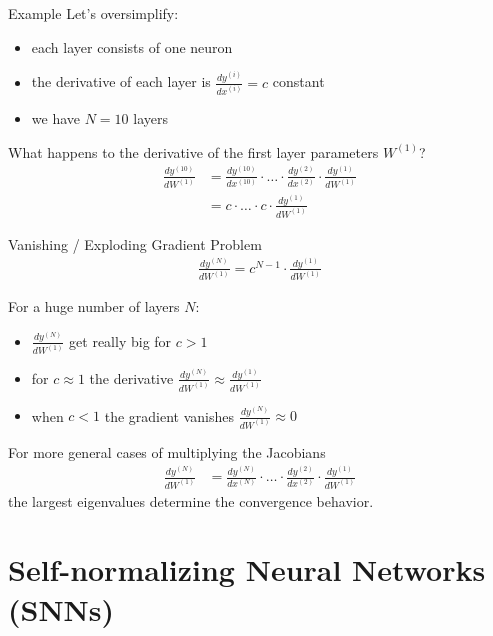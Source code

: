 \documentclass[aspectratio=169]{beamer}
\begin{document}
\begin{frame}{Example}
Let's oversimplify:
\begin{itemize}
\item each layer consists of one neuron
\item the derivative of each layer is $\frac{d y^{(i)} } {d x^{(i)}} = c $ constant
\item we have $N=10$ layers
\end{itemize}
What happens to the derivative of the first layer parameters $ W^{(1)} $?
\begin{align*}
\frac{d y^{(10)}} { d W^{(1)}} &= \frac{ d y^{(10)}} {d x^{(10 )}} \cdot \ldots \cdot \frac{ d y^{(2)}} {d x^{(2)}} \cdot \frac{d y^{(1)}} {d W^{(1)}} \\
 & = c \cdot \ldots \cdot c \cdot \frac{d y^{(1)}} {d W^{(1)}}
\end{align*}
\end{frame}



\begin{frame}{Vanishing / Exploding Gradient Problem}
\begin{align*}
\frac{d y^{(N)}} { d W^{(1)}} = c^{N -1} \cdot \frac{d y^{(1)}} {d W^{(1)}}
\end{align*}

For a huge number of layers $N$:
\begin{itemize}
\item $\frac{d y^{(N)}} { d W^{(1)}} $ get really big for $c > 1$
\item for $ c \approx 1 $ the derivative $\frac{d y^{(N)}} { d W^{(1)}}  \approx  \frac{d y^{(1)}} { d W^{(1)}} $
\item when $ c < 1 $ the gradient vanishes $ \frac{d y^{(N)}} { d W^{(1)}} \approx 0$
\end{itemize}
For more general cases of multiplying the Jacobians
\begin{align*}
\frac{d y^{(N)}} { d W^{(1)}} &= \frac{ d y^{(N)}} {d x^{(N )}} \cdot \ldots \cdot \frac{ d y^{(2)}} {d x^{(2)}} \cdot \frac{d y^{(1)}} {d W^{(1)}}
\end{align*}
the largest eigenvalues determine the convergence behavior. 

\end{frame}

\section{Self-normalizing Neural Networks (SNNs)}
\end{document}
